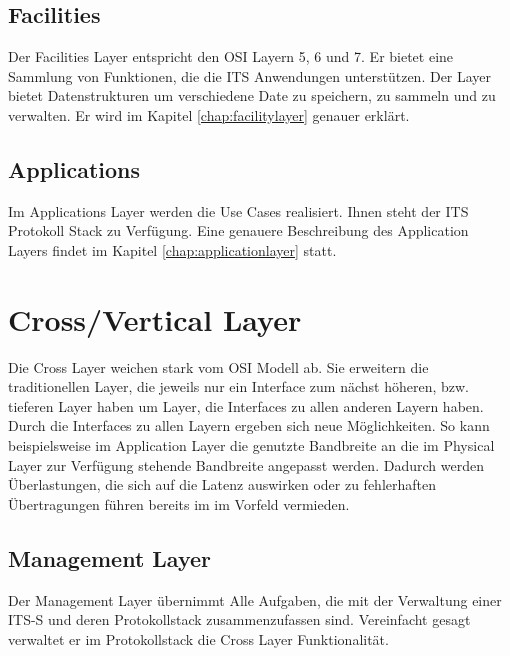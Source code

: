 \subsection{Facilities}
Der Facilities Layer entspricht den \ac{OSI} Layern 5, 6 und 7. Er bietet eine Sammlung von Funktionen, die die \ac{ITS} Anwendungen unterstützen. Der Layer bietet Datenstrukturen um verschiedene Date zu speichern, zu sammeln und zu verwalten. Er wird im Kapitel \ref{chap:facilitylayer} genauer erklärt.

\subsection{Applications}
Im Applications Layer werden die Use Cases realisiert. Ihnen steht der \ac{ITS} Protokoll Stack zu Verfügung. Eine genauere Beschreibung des Application Layers findet im Kapitel \ref{chap:applicationlayer} statt.

\section{Cross/Vertical Layer}
Die Cross Layer weichen stark vom \ac{OSI} Modell ab. Sie erweitern die traditionellen Layer, die jeweils nur ein Interface zum nächst höheren, bzw. tieferen Layer haben um Layer, die Interfaces zu allen anderen Layern haben. Durch die Interfaces zu allen Layern ergeben sich neue Möglichkeiten. So kann beispielsweise im Application Layer die genutzte Bandbreite an die im Physical Layer zur Verfügung stehende Bandbreite angepasst werden. Dadurch werden Überlastungen, die sich auf die Latenz auswirken oder zu fehlerhaften Übertragungen führen bereits im im Vorfeld vermieden.

\subsection{Management Layer \label{architektur_managementLayer}}
Der Management Layer übernimmt Alle Aufgaben, die mit der Verwaltung einer \ac{ITS-S} und deren Protokollstack zusammenzufassen sind. Vereinfacht gesagt verwaltet er im Protokollstack die Cross Layer Funktionalität. 


